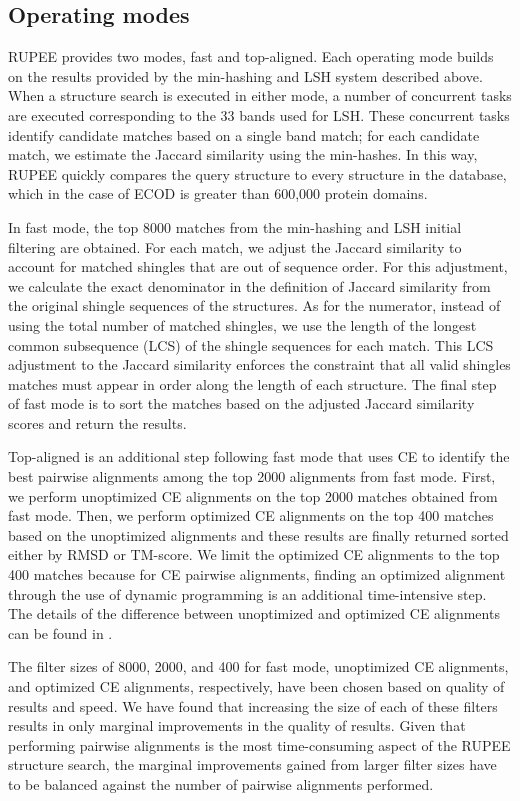 \documentclass[10pt,letterpaper]{article}
\begin{document}
\subsection*{Operating modes}

RUPEE provides two modes, fast and top-aligned. 
Each operating mode builds on the results provided by the min-hashing and LSH system described above. 
When a structure search is executed in either mode, a number of concurrent tasks are executed corresponding to the 33 bands used for LSH. 
These concurrent tasks identify candidate matches based on a single band match; for each candidate match, we estimate the Jaccard similarity using the min-hashes. 
In this way, RUPEE quickly compares the query structure to every structure in the database, which in the case of ECOD is greater than 600,000 protein domains.

In fast mode, the top 8000 matches from the min-hashing and LSH initial filtering are obtained.
For each match, we adjust the Jaccard similarity to account for matched shingles that are out of sequence order. 
For this adjustment, we calculate the exact denominator in the definition of Jaccard similarity from the original shingle sequences of the structures.
As for the numerator, instead of using the total number of matched shingles, we use the length of the longest common subsequence (LCS) of the shingle sequences for each match. 
This LCS adjustment to the Jaccard similarity enforces the constraint that all valid shingles matches must appear in order along the length of each structure. 
The final step of fast mode is to sort the matches based on the adjusted Jaccard similarity scores and return the results. 

Top-aligned is an additional step following fast mode that uses CE to identify the best pairwise alignments among the top 2000 alignments from fast mode.
First, we perform unoptimized CE alignments on the top 2000 matches obtained from fast mode. 
Then, we perform optimized CE alignments on the top 400 matches based on the unoptimized alignments and these results are finally returned sorted either by RMSD or TM-score. 
We limit the optimized CE alignments to the top 400 matches because for CE pairwise alignments, finding an optimized alignment through the use of dynamic programming is an additional time-intensive step.
The details of the difference between unoptimized and optimized CE alignments can be found in \cite{Shindyalov1998}.

The filter sizes of 8000, 2000, and 400 for fast mode, unoptimized CE alignments, and optimized CE alignments, respectively, have been chosen based on quality of results and speed. 
We have found that increasing the size of each of these filters results in only marginal improvements in the quality of results. 
Given that performing pairwise alignments is the most time-consuming aspect of the RUPEE structure search, the marginal improvements gained from larger filter sizes have to be balanced against the number of pairwise alignments performed. 
\end{document}
